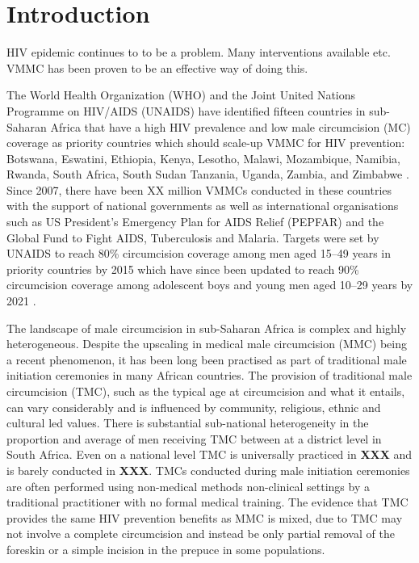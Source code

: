 \documentclass{article}
\begin{document}
\newpage



\section{Introduction}


HIV epidemic continues to to be a problem. Many interventions available etc. VMMC has been proven to be an effective way of doing this. 

The World Health Organization (WHO) and the Joint United Nations Programme on HIV/AIDS (UNAIDS) have identified fifteen countries in sub-Saharan Africa that have a high HIV prevalence and low male circumcision (MC) coverage as priority countries which should scale-up VMMC for HIV prevention: Botswana, Eswatini, Ethiopia, Kenya, Lesotho, Malawi, Mozambique, Namibia, Rwanda, South Africa, South Sudan Tanzania, Uganda, Zambia, and Zimbabwe  \cite{UNAIDSJoint, davis2018progress, WHOVoluntary2}. Since 2007, there have been XX million VMMCs conducted in these countries with the support of national governments as well as international organisations such as US President’s Emergency Plan for AIDS Relief (PEPFAR) and the Global Fund to Fight AIDS, Tuberculosis and Malaria. Targets were set by UNAIDS to reach 80\% circumcision coverage among men aged 15--49 years in priority countries by 2015 which have since been updated to reach 90\% circumcision coverage among adolescent boys and young men aged 10--29 years by 2021 \cite{WHOFramework}.

The landscape of male circumcision in sub-Saharan Africa is complex and highly heterogeneous. Despite the upscaling in medical male circumcision (MMC) being a recent phenomenon, it has been long been practised as part of traditional male initiation ceremonies in many African countries. The provision of traditional male circumcision (TMC), such as the typical age at circumcision and what it entails, can vary considerably and is influenced by community, religious, ethnic and cultural led values. There is substantial sub-national heterogeneity in the proportion and average of men receiving TMC between at a district level in South Africa. Even on a national level TMC is universally practiced in {\color{red}\bf XXX} and is barely conducted in {\color{red}\bf XXX}. TMCs conducted during male initiation ceremonies are often performed using non-medical methods non-clinical settings by a traditional practitioner with no formal medical training. The evidence that TMC provides the same HIV prevention benefits as MMC is mixed, due to TMC may not involve a complete circumcision and instead be only partial removal of the foreskin or a simple incision in the prepuce in some populations.   
\end{document}
